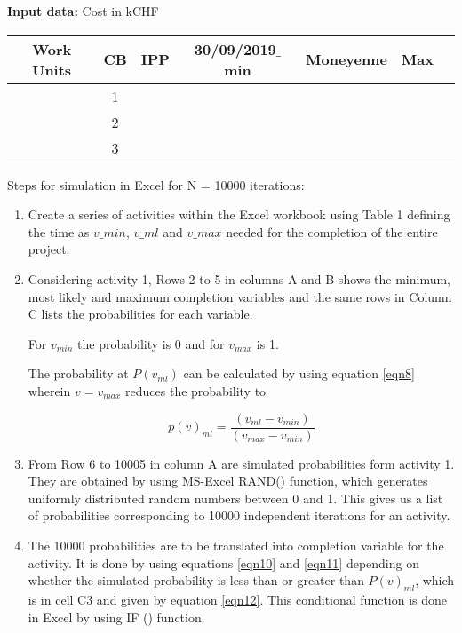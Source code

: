 \textbf{Input data:} Cost in kCHF
\begin{center}
	\begin{tabular}{ |c|c|c|c|c|c|c|} 
		\hline
		Work Units&CB & IPP & 30/09/2019$\_$min & Moneyenne&Max\\
		\hline
		&1 & &  & &\\ 
		\hline
		&2 & & &&\\ 
		\hline
		&3& & &&\\ 
		\hline
	\end{tabular}\label{table4}	
\end{center}


Steps for simulation in Excel for N = 10000 iterations:

\begin{enumerate}
	\item Create a series of activities within the Excel workbook using Table 1 defining the time as $v\_min$, $v\_ml$ and $v\_max$ needed for the completion of the entire project.
	
	\item Considering activity 1, Rows 2 to 5 in columns A and B shows the minimum, most likely and maximum completion variables and the same rows in Column C lists the probabilities for each variable.
	
	For $v_ {min} $ the probability is 0 and for $v_ {max} $ is 1. 
	
	The probability at $P (v_ {ml}) $ can be calculated by using equation \ref{eqn8} wherein $v = v_ {max} $ reduces the probability to 
	
	\begin{equation}
	p(v)_{ml}  = \frac{(v_{ml} - v_{min})}{  (v_{max} - v_{min}) } 
	\label{eqn5.1}
	\end{equation}
	
	\item From Row 6 to 10005 in column A are simulated probabilities form activity 1. They are obtained by using MS-Excel RAND() function, which generates uniformly distributed random numbers between 0 and 1. This gives us a list of probabilities corresponding to 10000 independent iterations for an activity.
	
	\item The 10000 probabilities are to be translated into completion variable for the activity. It is done by using equations \ref{eqn10} and \ref{eqn11} depending on whether the simulated probability is less than or greater than $P(v)_ {ml}$, which is in cell C3 and given by equation \ref{eqn12}. This conditional function is done in Excel by using IF () function.
	

\end{enumerate}
